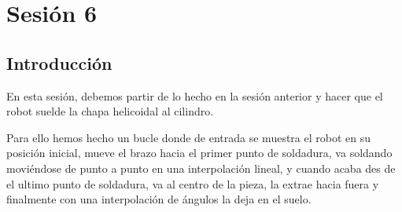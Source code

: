 \documentclass{article}
\let\oldsection\section
\renewcommand\section{\clearpage\oldsection}
\begin{document}
\section{Sesión 6}
\subsection{Introducción}
En esta sesión, debemos partir de lo hecho en la sesión anterior y hacer que el robot suelde la chapa helicoidal al cilindro.

Para ello hemos hecho un bucle donde de entrada se muestra el robot en su posición inicial, mueve el brazo hacia el primer punto de soldadura, va soldando moviéndose de punto a punto en una interpolación lineal, y cuando acaba des de el ultimo punto de soldadura, va al centro de la pieza, la extrae hacia fuera y finalmente con una interpolación de ángulos la deja en el suelo.
\end{document}
